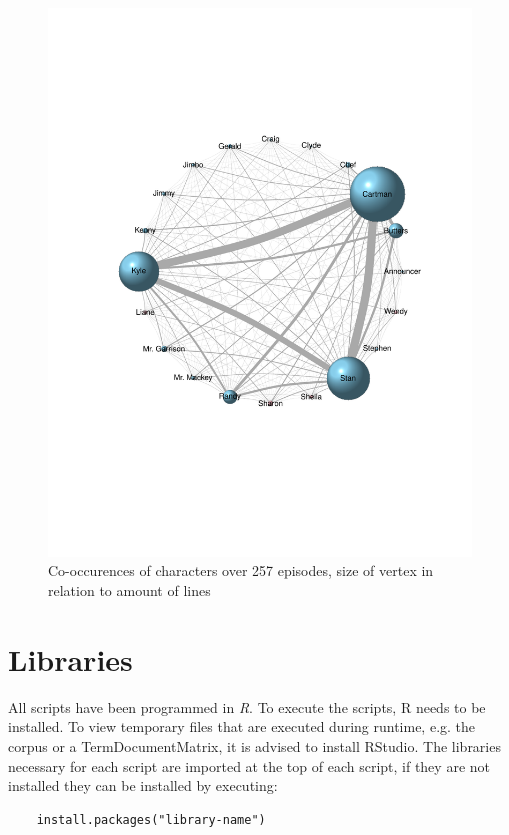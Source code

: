 \documentclass[10pt,a4paper]{article}
\begin{document}
	\begin{figure}[h]
	\centering
	\includegraphics[scale=0.7]{images/CoOccurence Matrix.pdf}
	\caption{Co-occurences of characters over 257 episodes, size of vertex in relation to amount of lines}
	\label{fig:CoOccurence}
	\end{figure}
	
	\section{Libraries}
	
	All scripts have been programmed in \textit{R}. To execute the scripts, R needs to be installed. To view temporary files that are executed during runtime, e.g. the corpus or a TermDocumentMatrix, it is advised to install RStudio. The libraries necessary for each script are imported at the top of each script, if they are not installed they can be installed by executing:
	
	\begin{verbatim}
	install.packages("library-name")
	\end{verbatim}
	
\end{document}
